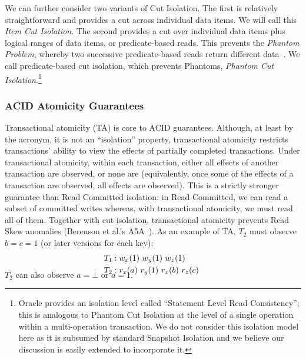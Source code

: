 We can further consider two variants of Cut Isolation. The first is
relatively straightforward and provides a cut across individual data
items. We will call this \textit{Item Cut Isolation}. The second
provides a cut over individual data items plus logical ranges of data
items, or predicate-based reads. This prevents the \textit{Phantom
  Problem}, whereby two successive predicate-based reads return
different data~\cite{gray-isolation}. We call predicate-based cut
isolation, which prevents Phantoms, \textit{Phantom Cut
  Isolation}.\footnote{Oracle provides an isolation level called
  ``Statement Level Read Consistency''; this is analogous to Phantom
  Cut Isolation at the level of a single operation within a
  multi-operation transaction. We do not consider this isolation model
  here as it is subsumed by standard Snapshot Isolation and we believe
  our discussion is easily extended to incorporate it.}

\subsubsection{ACID Atomicity Guarantees}

Transactional atomicity (TA) is core to ACID guarantees. Although, at
least by the acronym, it is not an ``isolation'' property,
transactional atomicity restricts transactions' ability to view the
effects of partially completed transactions. Under transactional
atomicity, within each transaction, either all effects of another
transaction are observed, or none are (equivalently, once some of the
effects of a transaction are observed, all effects are observed). This
is a strictly stronger guarantee than Read Committed isolation: in
Read Committed, we can read a subset of committed writes whereas, with
transactional atomicity, we must read all of them. Together with cut
isolation, transactional atomicity prevents Read Skew anomalies
(Berenson et al.'s A5A~\cite{ansicritique}). As an example of
TA, $T_2$ must observe $b=c=1$ (or later versions
for each key):
\vspace{-.5em}
\begin{align*}
\small
T_1 &: w_x(1)~w_y(1)~w_z(1)
\\T_2 &: r_x(a)~r_y(1)~r_x(b)~r_z(c)~\\[-1.5em]
\end{align*}
$T_2$ can also observe $a=\bot$ or $a=1$.

